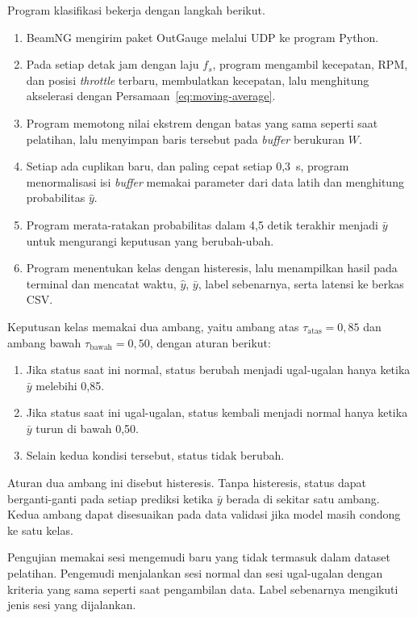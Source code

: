 Program klasifikasi bekerja dengan langkah berikut.
\begin{enumerate}
  \item BeamNG mengirim paket OutGauge melalui UDP ke program Python.
  \item Pada setiap detak jam dengan laju $f_{s}$, program mengambil kecepatan, RPM, dan posisi \textit{throttle} terbaru, membulatkan kecepatan, lalu menghitung akselerasi dengan Persamaan~\ref{eq:moving-average}.
  \item Program memotong nilai ekstrem dengan batas yang sama seperti saat pelatihan, lalu menyimpan baris tersebut pada \textit{buffer} berukuran $W$.
  \item Setiap ada cuplikan baru, dan paling cepat setiap 0,3~s, program menormalisasi isi \textit{buffer} memakai parameter dari data latih dan menghitung probabilitas $\hat{y}$.
  \item Program merata-ratakan probabilitas dalam 4,5 detik terakhir menjadi $\bar{y}$ untuk mengurangi keputusan yang berubah-ubah.
  \item Program menentukan kelas dengan histeresis, lalu menampilkan hasil pada terminal dan mencatat waktu, $\hat{y}$, $\bar{y}$, label sebenarnya, serta latensi ke berkas CSV.
\end{enumerate}
Keputusan kelas memakai dua ambang, yaitu ambang atas $\tau_{\mathrm{atas}} = 0{,}85$ dan ambang bawah $\tau_{\mathrm{bawah}} = 0{,}50$, dengan aturan berikut:
\begin{enumerate}
  \item Jika status saat ini normal, status berubah menjadi ugal-ugalan hanya ketika $\bar{y}$ melebihi 0,85.
  \item Jika status saat ini ugal-ugalan, status kembali menjadi normal hanya ketika $\bar{y}$ turun di bawah 0,50.
  \item Selain kedua kondisi tersebut, status tidak berubah.
\end{enumerate}
Aturan dua ambang ini disebut histeresis. Tanpa histeresis, status dapat berganti-ganti pada setiap prediksi ketika $\bar{y}$ berada di sekitar satu ambang. Kedua ambang dapat disesuaikan pada data validasi jika model masih condong ke satu kelas.

Pengujian memakai sesi mengemudi baru yang tidak termasuk dalam dataset pelatihan. Pengemudi menjalankan sesi normal dan sesi ugal-ugalan dengan kriteria yang sama seperti saat pengambilan data. Label sebenarnya mengikuti jenis sesi yang dijalankan.

